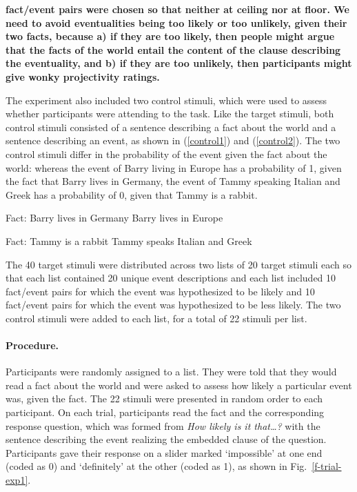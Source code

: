 \documentclass[11pt,fleqn]{article}
\newcommand{\6}{\mbox{$[\hspace*{-.6mm}[$}}
\newcommand{\9}{\mbox{$]\hspace*{-.6mm}]$}}
\newcommand{\figref}[1]{Fig.~\ref{#1}}
\begin{document}
{\bf fact/event pairs were chosen so that neither at ceiling nor at floor. We need to avoid eventualities being too likely or too unlikely, given their two facts, because a) if they are too likely, then people might argue that the facts of the world entail the content of the clause describing the eventuality, and b) if they are too unlikely, then participants might give wonky projectivity ratings.}

The experiment also included two control stimuli, which were used to assess whether participants were attending to the task. Like the target stimuli, both control stimuli consisted of a sentence describing a fact about the world and a sentence describing an event, as shown in (\ref{control1}) and (\ref{control2}). The two control stimuli differ in the probability of the event given the fact about the world: whereas the event of Barry living in Europe has a probability of 1, given the fact that Barry lives in Germany, the event of Tammy speaking Italian and Greek has a probability of 0, given that Tammy is a rabbit. 

\begin{exe}
\ex\label{control1}
\begin{xlist}
 Fact: Barry lives in Germany 
 Barry lives in Europe 
\end{xlist}
\ex\label{control2}
\begin{xlist}
 Fact: Tammy is a rabbit 
 Tammy speaks Italian and Greek 
\end{xlist}
\end{exe}

The 40 target stimuli were distributed across two lists of 20 target stimuli each so that each list contained 20 unique event descriptions and each list included 10 fact/event pairs for which the event was hypothesized to be likely and 10 fact/event pairs for which the event was hypothesized to be less likely. The two control stimuli were added to each list, for a total of 22 stimuli per list. 

\paragraph{Procedure.} Participants were randomly assigned to a list. They were told that they would read a fact about the world and were asked to assess how likely a particular event was, given the fact. The 22 stimuli were presented in random order to each participant. On each trial, participants read the fact and the corresponding response question, which was formed from {\em How likely is it that\ldots ?} with the sentence describing the event realizing the embedded clause of the question. Participants gave their response on a slider marked `impossible' at one end (coded as 0) and `definitely' at the other (coded as 1), as shown in \figref{f-trial-exp1}. 
\end{document}
